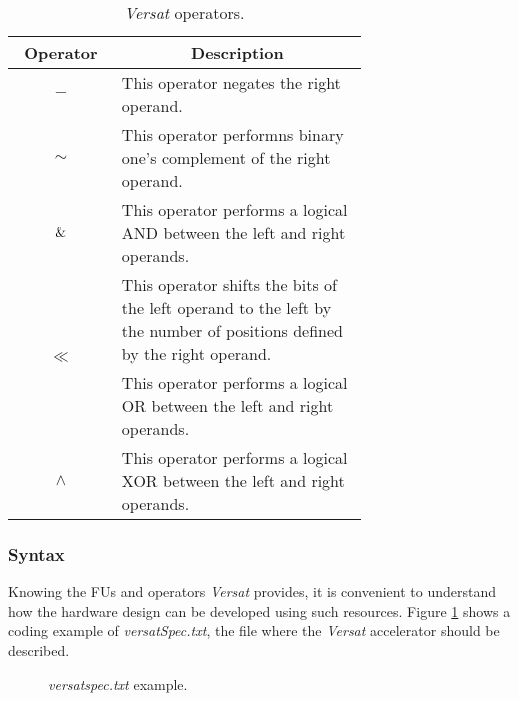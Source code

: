 \begin{table}[H]
    \centering
    \begin{tabular}{|c|p{0.7\linewidth}|}
        \hline
        \multicolumn{1}{|c|}{\textbf{Operator}} & \multicolumn{1}{c|}{\textbf{Description}} \\
        \hline
        \multirow{1}{*}{\textbf{$-$}} & This operator negates the right operand.  \\
        \hline
        \multirow{1}{*}{\textbf{$\sim$}} & This operator performns binary one's complement of the right operand. \\
        \hline
        \multirow{1}{*}{\textbf{$\And$}} & This operator performs a logical AND between the left and right operands. \\
        \hline
        \multirow{2}{*}{\textbf{$\ll$}} & This operator shifts the bits of the left operand to the left by the number of positions defined by the right operand. \\
        \hline
        \multirow{1}{*}{\textbf{$\vert$}} & This operator performs a logical OR between the left and right operands. \\
        \hline
        \multirow{1}{*}{\textbf{$\wedge$}} & This operator performs a logical XOR between the left and right operands. \\
        \hline
    \end{tabular}
    \caption{\textit{Versat} operators.}
    \label{tab:op}
\end{table}

\vspace{0.5cm}

\subsubsection{Syntax}

Knowing the FUs and operators \textit{Versat} provides, it is convenient to understand how the hardware design can be developed using such resources.
Figure \ref{versatspec} shows a coding example of \textit{versatSpec.txt}, the file where the \textit{Versat} accelerator should be described.

\vspace{1cm}

\begin{figure}[H]
\centerline{}
\caption{\textit{versatspec.txt} example.}
\label{versatspec}
\end{figure}

